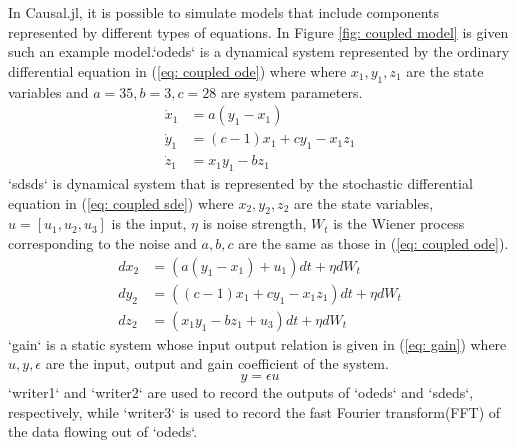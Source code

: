 \documentclass{juliacon}
\begin{document}
In Causal.jl, it is possible to simulate models that include components represented by different types of equations. In Figure \ref{fig: coupled model} is given such an example model.`odeds` is a dynamical system represented by the ordinary differential equation in (\ref{eq: coupled ode}) where where $x_1, y_1, z_1$ are the state variables and $a=35, b=3, c = 28$ are system parameters.
\begin{equation}
    \begin{split}
        \dot{x}_1 &= a (y_1 - x_1) \\
        \dot{y}_1 &= (c - 1) x_1 + c y_1 - x_1 z_1 \\
        \dot{z}_1 &= x_1 y_1 - b z_1
    \end{split}
    \label{eq: coupled ode}
\end{equation}
`sdsds` is dynamical system that is represented by the stochastic differential equation in (\ref{eq: coupled sde}) where $x_2, y_2, z_2$ are the state variables, $u=[u_1,u_2, u_3]$ is the input, $\eta$ is noise strength, $W_t$ is the Wiener process corresponding to the noise and $a, b, c$ are the same as those in (\ref{eq: coupled ode}).
\begin{equation}
    \begin{split}
        dx_2 &= (a (y_1 - x_1) + u_1) dt + \eta dW_t \\
        dy_2 &= ((c - 1) x_1 + c y_1 - x_1 z_1)dt + \eta dW_t \\
        dz_2 &= (x_1 y_1 - b z_1 + u_3) dt + \eta dW_t 
    \end{split}
    \label{eq: coupled sde}
\end{equation}
`gain` is a static system whose input output relation is given in (\ref{eq: gain}) where $u, y, \epsilon$ are the input, output and gain coefficient of the system. 
\begin{equation}
    y = \epsilon u
    \label{eq: gain}
\end{equation}
`writer1` and `writer2` are used to record the outputs of `odeds` and `sdeds`, respectively, while `writer3` is used to record the fast Fourier transform(FFT) of the data flowing out of `odeds`\cite{proakis2004digital}. 
\end{document}
